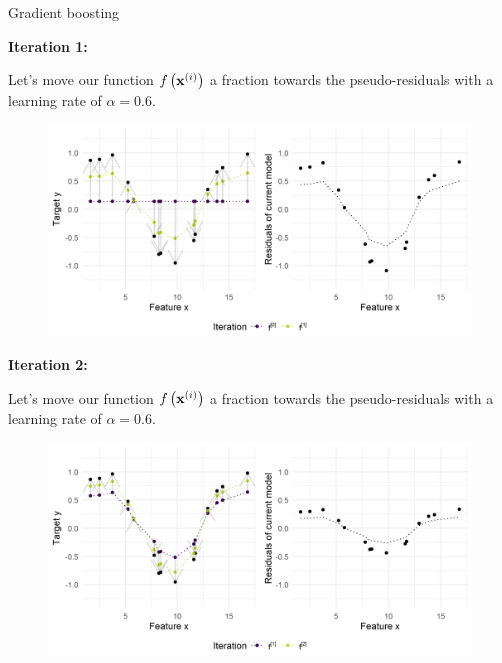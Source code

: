 \begin{vbframe}{Gradient boosting}

\textbf{Iteration 1:}

Let's move our function $f\left(\mathbf{x}^{(i)}\right)$ a fraction towards the pseudo-residuals with a learning rate of $\alpha = 0.6$.


\begin{figure}
  \includegraphics[width=\textwidth]{figure/fig-gb-concept-pseudo-resi-1.png}
\end{figure}

\framebreak

\textbf{Iteration 2:}

Let's move our function $f\left(\mathbf{x}^{(i)}\right)$ a fraction towards the pseudo-residuals with a learning rate of $\alpha = 0.6$.


\begin{figure}
  \includegraphics[width=\textwidth]{figure/fig-gb-concept-pseudo-resi-2.png}
\end{figure}

\framebreak
\begin{footnotesize}



\end{footnotesize}
\end{vbframe}
